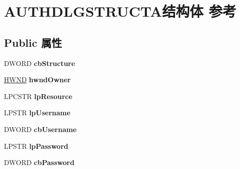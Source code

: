 \hypertarget{struct_a_u_t_h_d_l_g_s_t_r_u_c_t_a}{}\section{A\+U\+T\+H\+D\+L\+G\+S\+T\+R\+U\+C\+T\+A结构体 参考}
\label{struct_a_u_t_h_d_l_g_s_t_r_u_c_t_a}
\subsection*{Public 属性}
\begin{DoxyCompactItemize}
\item 
\mbox{\label{struct_a_u_t_h_d_l_g_s_t_r_u_c_t_a_af571e0764449674afec69c4d05b960a8}} 
D\+W\+O\+RD {\bfseries cb\+Structure}
\item 
\mbox{\label{struct_a_u_t_h_d_l_g_s_t_r_u_c_t_a_a29a587b13cfc3de0c0f244269273d295}} 
\hyperlink{interfacevoid}{H\+W\+ND} {\bfseries hwnd\+Owner}
\item 
\mbox{\label{struct_a_u_t_h_d_l_g_s_t_r_u_c_t_a_af5b5e3dac480cd44f2afb19c0ef5980f}} 
L\+P\+C\+S\+TR {\bfseries lp\+Resource}
\item 
\mbox{\label{struct_a_u_t_h_d_l_g_s_t_r_u_c_t_a_ab8b60741b1d20ee45405717c4a83d7f4}} 
L\+P\+S\+TR {\bfseries lp\+Username}
\item 
\mbox{\label{struct_a_u_t_h_d_l_g_s_t_r_u_c_t_a_adbd0e01dfa7789b6e7e9a3b4a9fd01e5}} 
D\+W\+O\+RD {\bfseries cb\+Username}
\item 
\mbox{\label{struct_a_u_t_h_d_l_g_s_t_r_u_c_t_a_a80de87d1fe21543e9329205b0c02626b}} 
L\+P\+S\+TR {\bfseries lp\+Password}
\item 
\mbox{\label{struct_a_u_t_h_d_l_g_s_t_r_u_c_t_a_a08c9a9f0894b9c4247b2da65abbe1314}} 
D\+W\+O\+RD {\bfseries cb\+Password}
\item 
\mbox{\label{struct_a_u_t_h_d_l_g_s_t_r_u_c_t_a_a6c3c93628655cece6167393ef7057b85}} 

\end{DoxyCompactItemize}
